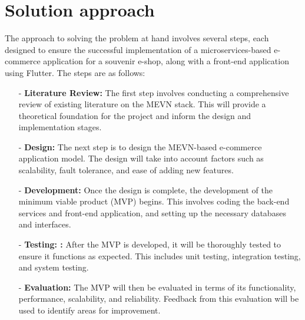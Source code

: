 \section{Solution approach}
The approach to solving the problem at hand involves several steps, each designed to ensure the successful implementation of a microservices-based e-commerce application for a souvenir e-shop, along with a front-end application using Flutter. The steps are as follows:
\begin{enumerate}
    \item[-] \textbf{Literature Review:} The first step involves conducting a comprehensive review of existing literature on the MEVN stack. This will provide a theoretical foundation for the project and inform the design and implementation stages.
    \item[-] \textbf{Design:} The next step is to design the MEVN-based e-commerce application model. The design will take into account factors such as scalability, fault tolerance, and ease of adding new features.
    \item[-] \textbf{Development:} Once the design is complete, the development of the minimum viable product (MVP) begins. This involves coding the back-end services and front-end application, and setting up the necessary databases and interfaces.
    \item[-] \textbf{Testing: :} After the MVP is developed, it will be thoroughly tested to ensure it functions as expected. This includes unit testing, integration testing, and system testing.
    \item[-] \textbf{Evaluation:} The MVP will then be evaluated in terms of its functionality, performance, scalability, and reliability. Feedback from this evaluation will be used to identify areas for improvement.
\end{enumerate}


